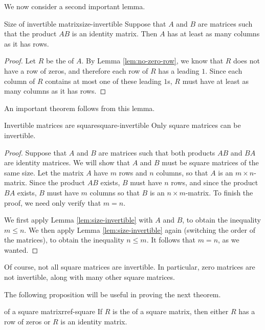 We now consider a second important lemma.

\begin{lemma}{Size of invertible matrix}{size-invertible}
Suppose that $A$ and $B$ are matrices such that the product $AB$ is an identity matrix. Then $A$ has at least as many columns as it has rows.
\end{lemma}

\begin{proof}
Let $R$ be the {\rref} of $A$. By Lemma \ref{lem:no-zero-row}, we know that $R$ does not have a row of zeros, and therefore each row of $R$ has a leading $1$. Since each column of $R$ contains at most one of these leading $1$s, $R$ must have at least as many columns as it has rows.
\end{proof}

An important theorem follows from this lemma. 

\begin{theorem}{Invertible matrices are square}{square-invertible}
Only square matrices can be invertible.
\end{theorem}

\begin{proof}
Suppose that $A$ and $B$ are matrices such that both products $AB$ and $BA$ are identity matrices. We will show that $A$ and $B$ must be square matrices of the same size. Let the matrix $A$ have $m$ rows and $n$ columns, so that $A$ is an $m \times n$-matrix. Since the product $AB$ exists, $B$ must have $n$ rows, and since the product $BA$ exists, $B$ must have $m$ columns so that $B$ is an $n \times m$-matrix. To finish the proof, we need only verify that $m=n$. 

We first apply Lemma \ref{lem:size-invertible} with $A$ and $B$, to obtain the inequality $m \leq n$. We then apply Lemma \ref{lem:size-invertible} again (switching the order of the matrices), to obtain the inequality $n \leq m$. It follows that $m=n$, as we wanted.
\end{proof}

Of course, not all square matrices are invertible. In particular, zero matrices are not invertible, along with many other square matrices. 

The following proposition will be useful in proving the next theorem.

\begin{proposition}{{\Rref} of a square matrix}{rref-square}
If $R$ is the {\rref} of a square matrix, then either $R$ has a row of zeros or $R$ is an identity matrix. 
\end{proposition}

